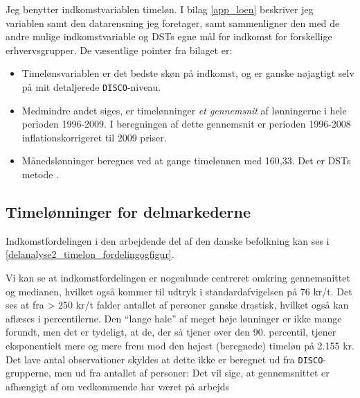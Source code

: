 Jeg benytter indkomstvariablen timeløn. I bilag \ref{app_loen} beskriver jeg variablen samt den datarensning jeg foretager, samt sammenligner den med de andre mulige indkomstvariable og DSTs egne mål for indkomst for forskellige erhvervsgrupper. De væsentlige pointer fra bilaget er:

 \begin{itemize}
  \itemsep -0.5em
  	\item Timelønsvariablen er det bedste skøn på indkomst, og er ganske nøjagtigt selv på mit detaljerede \texttt{DISCO}-niveau.
  	\item Medmindre andet siges, er timelønninger \emph{et gennemsnit} af lønningerne i hele perioden 1996-2009. I beregningen af dette gennemsnit er perioden 1996-2008 inflationskorrigeret til 2009 priser.
  	\item Månedslønninger beregnes ved at gange timelønnen med 160,33. Det er DSTs metode \parencite[32]{DST2009}.
 \end{itemize}
%


%
\subsection{Timelønninger for delmarkederne \label{subsec_delanalyse2_loenninger}}
%

Indkomstfordelingen i den arbejdende del af den danske befolkning kan ses i  \ref{delanalyse2_timelon_fordelingogfigur}. 

Vi kan se at indkomstfordelingen er nogenlunde centreret omkring gennemsnittet og medianen, hvilket også kommer til udtryk i standardafvigelsen på 76 kr/t. Det ses at fra > 250 kr/t falder antallet af personer ganske drastisk, hvilket også kan aflæses i percentilerne. Den “lange hale” af meget høje lønninger er ikke mange forundt, men det er tydeligt, at de, der så tjener over den 90. percentil, tjener eksponentielt mere og mere frem mod den højest (beregnede) timeløn på 2.155 kr. Det lave antal observationer skyldes at dette ikke er beregnet ud fra \texttt{DISCO}-grupperne, men ud fra antallet af personer: Det vil sige, at gennemsnittet er afhængigt af om vedkommende har været på arbejds



